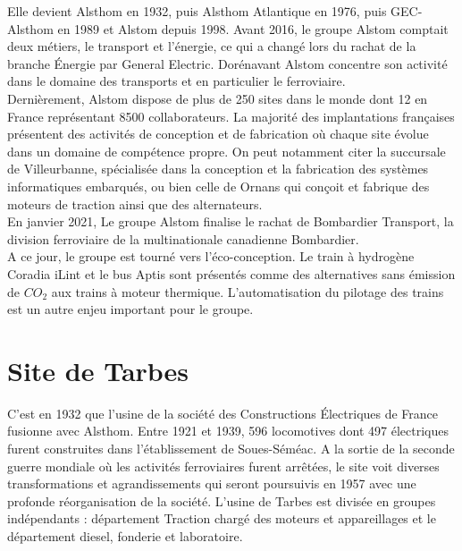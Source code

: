 \documentclass[a4paper]{report}
\begin{document}
	Elle devient Alsthom en 1932, puis Alsthom Atlantique en 1976, puis GEC-Alsthom en 1989 et Alstom depuis 1998. Avant 2016, le groupe Alstom comptait deux métiers, le transport et l'énergie, ce qui a changé lors du rachat de la branche Énergie par General Electric. Dorénavant Alstom concentre son activité dans le domaine des transports et en particulier le ferroviaire.\\
	
	Dernièrement, Alstom dispose de plus de 250 sites dans le monde dont 12 en France représentant 8500 collaborateurs. La majorité des implantations françaises présentent des activités de conception et de fabrication où chaque site évolue dans un domaine de compétence propre.  On peut notamment citer la succursale de Villeurbanne, spécialisée dans la conception et la fabrication des systèmes informatiques embarqués, ou bien celle de Ornans qui conçoit et fabrique des moteurs de traction ainsi que des alternateurs.\\
	
	En janvier 2021, Le groupe Alstom finalise le rachat de Bombardier Transport, la division ferroviaire de la multinationale canadienne Bombardier.\\
	
	A ce jour, le groupe est tourné vers l'éco-conception. Le train à hydrogène Coradia iLint et le bus Aptis sont présentés comme des alternatives sans émission de $CO_2$ aux trains à moteur thermique. L'automatisation du pilotage des trains est un autre enjeu important pour le groupe.\\
	
\pagebreak %
	
	\section{Site de Tarbes}
	C'est en 1932 que l'usine de la société des Constructions Électriques de France fusionne avec Alsthom.
	Entre 1921 et 1939, 596 locomotives dont 497 électriques furent construites dans l'établissement de Soues-Séméac.
	A la sortie de la seconde guerre mondiale où les activités ferroviaires furent arrêtées, le site voit diverses transformations et agrandissements qui seront poursuivis en 1957 avec une profonde réorganisation de la société.
	L'usine de Tarbes est divisée en groupes indépendants : département Traction chargé des moteurs et appareillages et le département diesel, fonderie et laboratoire.
	
\end{document}

